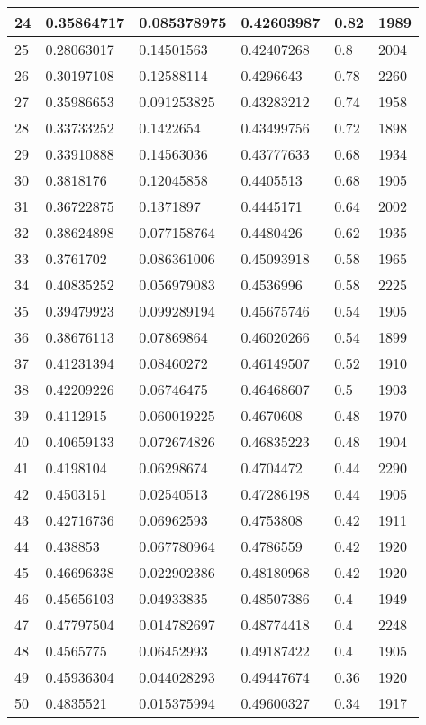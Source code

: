 \begin{longtable}{|l|l|l|l|l|l|}
24 & 0.35864717 & 0.085378975 & 0.42603987 & 0.82 & 1989 \\ \hline 
25 & 0.28063017 & 0.14501563 & 0.42407268 & 0.8 & 2004 \\ \hline 
26 & 0.30197108 & 0.12588114 & 0.4296643 & 0.78 & 2260 \\ \hline 
27 & 0.35986653 & 0.091253825 & 0.43283212 & 0.74 & 1958 \\ \hline 
28 & 0.33733252 & 0.1422654 & 0.43499756 & 0.72 & 1898 \\ \hline 
29 & 0.33910888 & 0.14563036 & 0.43777633 & 0.68 & 1934 \\ \hline 
30 & 0.3818176 & 0.12045858 & 0.4405513 & 0.68 & 1905 \\ \hline 
31 & 0.36722875 & 0.1371897 & 0.4445171 & 0.64 & 2002 \\ \hline 
32 & 0.38624898 & 0.077158764 & 0.4480426 & 0.62 & 1935 \\ \hline 
33 & 0.3761702 & 0.086361006 & 0.45093918 & 0.58 & 1965 \\ \hline 
34 & 0.40835252 & 0.056979083 & 0.4536996 & 0.58 & 2225 \\ \hline 
35 & 0.39479923 & 0.099289194 & 0.45675746 & 0.54 & 1905 \\ \hline 
36 & 0.38676113 & 0.07869864 & 0.46020266 & 0.54 & 1899 \\ \hline 
37 & 0.41231394 & 0.08460272 & 0.46149507 & 0.52 & 1910 \\ \hline 
38 & 0.42209226 & 0.06746475 & 0.46468607 & 0.5 & 1903 \\ \hline 
39 & 0.4112915 & 0.060019225 & 0.4670608 & 0.48 & 1970 \\ \hline 
40 & 0.40659133 & 0.072674826 & 0.46835223 & 0.48 & 1904 \\ \hline 
41 & 0.4198104 & 0.06298674 & 0.4704472 & 0.44 & 2290 \\ \hline 
42 & 0.4503151 & 0.02540513 & 0.47286198 & 0.44 & 1905 \\ \hline 
43 & 0.42716736 & 0.06962593 & 0.4753808 & 0.42 & 1911 \\ \hline 
44 & 0.438853 & 0.067780964 & 0.4786559 & 0.42 & 1920 \\ \hline 
45 & 0.46696338 & 0.022902386 & 0.48180968 & 0.42 & 1920 \\ \hline 
46 & 0.45656103 & 0.04933835 & 0.48507386 & 0.4 & 1949 \\ \hline 
47 & 0.47797504 & 0.014782697 & 0.48774418 & 0.4 & 2248 \\ \hline 
48 & 0.4565775 & 0.06452993 & 0.49187422 & 0.4 & 1905 \\ \hline 
49 & 0.45936304 & 0.044028293 & 0.49447674 & 0.36 & 1920 \\ \hline 
50 & 0.4835521 & 0.015375994 & 0.49600327 & 0.34 & 1917 \\ \hline 
\end{longtable}